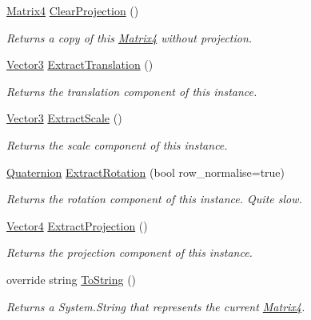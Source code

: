 \begin{DoxyCompactItemize}
\hyperlink{struct_open_t_k_1_1_matrix4}{Matrix4} \hyperlink{struct_open_t_k_1_1_matrix4_aa4f049710b2372cfe2fd8e6b2f7a0bfb}{Clear\-Projection} ()
\begin{DoxyCompactList}\small\item\em Returns a copy of this \hyperlink{struct_open_t_k_1_1_matrix4}{Matrix4} without projection. \end{DoxyCompactList}\item 
\hyperlink{struct_open_t_k_1_1_vector3}{Vector3} \hyperlink{struct_open_t_k_1_1_matrix4_ab68e3fc8b52392d7eb069b86eb086355}{Extract\-Translation} ()
\begin{DoxyCompactList}\small\item\em Returns the translation component of this instance. \end{DoxyCompactList}\item 
\hyperlink{struct_open_t_k_1_1_vector3}{Vector3} \hyperlink{struct_open_t_k_1_1_matrix4_ac7f04f8f1cb009aba1a16cbf88a7bf6a}{Extract\-Scale} ()
\begin{DoxyCompactList}\small\item\em Returns the scale component of this instance. \end{DoxyCompactList}\item 
\hyperlink{struct_open_t_k_1_1_quaternion}{Quaternion} \hyperlink{struct_open_t_k_1_1_matrix4_aee168366ed34711c3f041d1a681124f0}{Extract\-Rotation} (bool row\-\_\-normalise=true)
\begin{DoxyCompactList}\small\item\em Returns the rotation component of this instance. Quite slow. \end{DoxyCompactList}\item 
\hyperlink{struct_open_t_k_1_1_vector4}{Vector4} \hyperlink{struct_open_t_k_1_1_matrix4_a1ad1b927dfc9833afe2041d0f0ff2068}{Extract\-Projection} ()
\begin{DoxyCompactList}\small\item\em Returns the projection component of this instance. \end{DoxyCompactList}\item 
override string \hyperlink{struct_open_t_k_1_1_matrix4_af08979c6b008e81d168ec721749b6ae1}{To\-String} ()
\begin{DoxyCompactList}\small\item\em Returns a System.\-String that represents the current \hyperlink{struct_open_t_k_1_1_matrix4}{Matrix4}. \end{DoxyCompactList}\item 

\end{DoxyCompactItemize}

